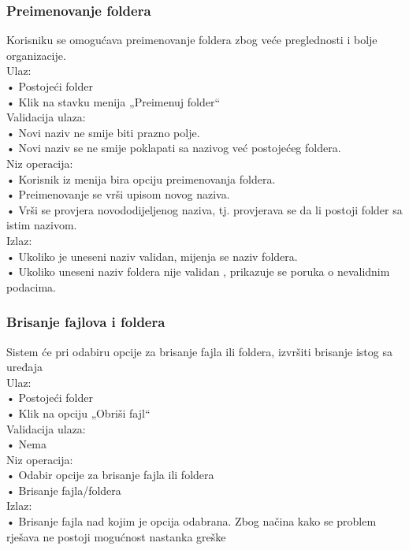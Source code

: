 \documentclass[utf8]{article}
\begin{document}
\subsubsection{Preimenovanje foldera}
Korisniku se omogućava preimenovanje foldera zbog veće preglednosti i bolje organizacije.\\
Ulaz:\\
•	Postojeći folder\\
•	Klik na stavku menija „Preimenuj folder“\\
Validacija ulaza:\\
•	Novi naziv ne smije biti prazno polje.\\
•	Novi naziv se ne smije poklapati sa nazivog već postojećeg foldera.\\
Niz operacija:\\
•	Korisnik iz menija bira opciju preimenovanja foldera.\\
•	Preimenovanje se vrši upisom novog naziva.\\
•	Vrši se provjera novododijeljenog naziva, tj. provjerava se da li postoji folder sa istim nazivom.\\
Izlaz:\\
•	Ukoliko je uneseni naziv validan, mijenja se naziv foldera.\\
•	Ukoliko uneseni naziv foldera nije validan , prikazuje se poruka o nevalidnim podacima.\\
\subsubsection{Brisanje fajlova i foldera}
Sistem će pri odabiru opcije za brisanje fajla ili foldera, izvršiti brisanje istog sa uređaja\\
Ulaz:\\
•	Postojeći folder\\
•	Klik na opciju  „Obriši fajl“\\
Validacija ulaza:\\
•	Nema\\
Niz operacija:\\
•	Odabir opcije za brisanje fajla ili foldera\\
•	Brisanje fajla/foldera\\
Izlaz:\\
•	Brisanje fajla nad kojim je opcija odabrana. Zbog načina kako se problem rješava ne postoji mogućnost nastanka greške\\
\end{document}
